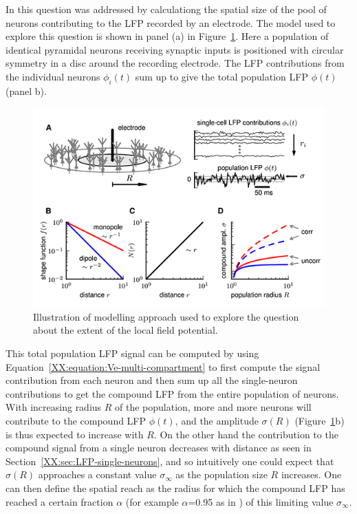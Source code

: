 In \citet{Linden2011} this question was addressed by calculationg the spatial size of the pool of neurons 
contributing to the LFP recorded by an electrode. The model used to explore this question
is shown in panel (a) in Figure~\ref{LFP:fig:how-local}.
Here a population of identical pyramidal neurons receiving synaptic inputs is positioned
with circular symmetry in a disc around the recording electrode. The LFP contributions from the individual neurons 
$\phi_i(t)$ sum up to give the total population LFP  $\phi(t)$ (panel b).

\begin{figure}
\begin{center}
\includegraphics{Figures/LFP/LFP-how-local-is-the-LFP-w90-r150}
\end{center}
\caption[]{Illustration of modelling approach used to explore the question
about the extent of the local field potential.
}
\label{LFP:fig:how-local}
\end{figure}
  
This total population LFP signal can be computed by using 
Equation~\ref{XX:equation:Ve-multi-compartment} to first compute the signal contribution from each neuron and 
then sum up all the single-neuron contributions to get the compound LFP from the entire population of neurons.
With increasing radius $R$ of the population, more and more neurons will contribute to the compound LFP $\phi(t)$,
and the amplitude $\sigma(R)$ (Figure~\ref{LFP:fig:how-local}b) is thus expected to increase with
$R$. On the other hand the contribution to the compound signal from a single neuron decreases with distance 
as seen in Section~\ref{XX:sec:LFP-single-neurons}, and so intuitively one could expect that $\sigma(R)$ approaches
a constant value $\sigma_\infty$ as the population size $R$ increases. One can then define the spatial reach as the radius for which
the compound LFP has reached a certain fraction $\alpha$ (for example $\alpha$=0.95 as in \citet{Linden2011}) of this limiting value $\sigma_\infty$. 


